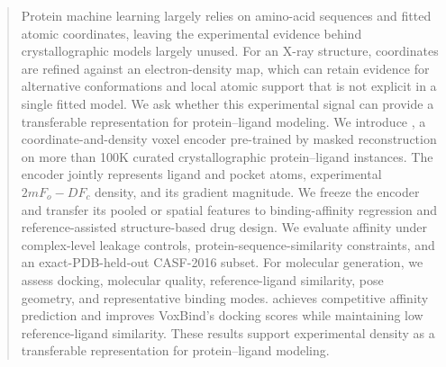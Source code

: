 
\begin{abstract}
Protein machine learning largely relies on amino-acid sequences and fitted
atomic coordinates, leaving the experimental evidence behind crystallographic
models largely unused. For an X-ray structure, coordinates are refined against
an electron-density map, which can retain evidence for alternative
conformations and local atomic support that is not explicit in a single fitted
model. We ask whether this experimental signal can provide a transferable
representation for protein--ligand modeling. We introduce \ours{}, a
coordinate-and-density voxel encoder pre-trained by masked reconstruction on
more than 100K curated crystallographic protein--ligand instances. The encoder
jointly represents ligand and pocket atoms, experimental $2mF_o-DF_c$ density,
and its gradient magnitude. We freeze the encoder and transfer its pooled or
spatial features to binding-affinity regression and reference-assisted
structure-based drug design. We evaluate affinity under complex-level leakage
controls, protein-sequence-similarity constraints, and an exact-PDB-held-out
CASF-2016 subset. For molecular generation, we assess docking, molecular
quality, reference-ligand similarity, pose geometry, and representative binding
modes. \ours{} achieves competitive affinity prediction and improves VoxBind's
docking scores while maintaining low reference-ligand similarity. These results
support experimental density as a transferable representation for
protein--ligand modeling.
\end{abstract}
